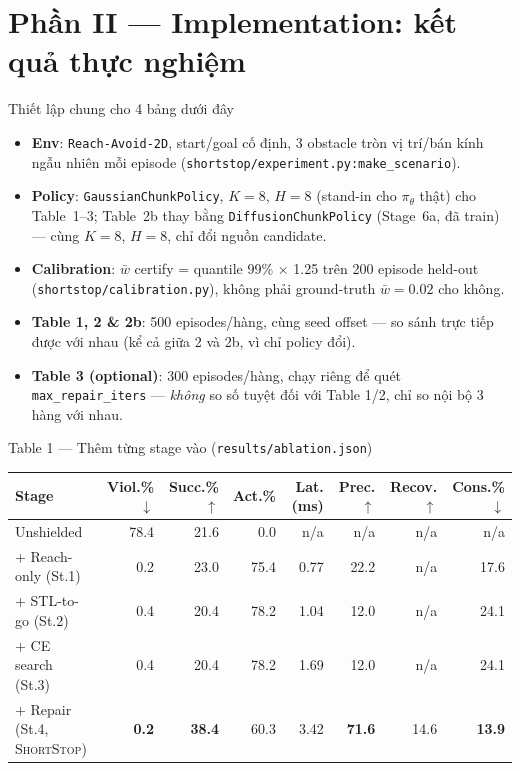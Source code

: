 \documentclass[aspectratio=169]{beamer}
\newcommand{\st}{\textsc{ShortStop}}
\begin{document}
\section{Phần II --- Implementation: kết quả thực nghiệm}

\begin{frame}[t,shrink=8]{Thiết lập chung cho 4 bảng dưới đây}
\begin{itemize}
    \item \textbf{Env}: \texttt{Reach-Avoid-2D}, start/goal cố định, 3 obstacle tròn vị trí/bán kính ngẫu nhiên mỗi episode (\texttt{shortstop/experiment.py:make\_scenario}).
    \item \textbf{Policy}: \texttt{GaussianChunkPolicy}, $K=8$, $H=8$ (stand-in cho $\pi_\theta$ thật) cho Table~1--3; Table~2b thay bằng \texttt{DiffusionChunkPolicy} (Stage~6a, đã train) --- cùng $K=8$, $H=8$, chỉ đổi nguồn candidate.
    \item \textbf{Calibration}: $\bar w$ certify = quantile 99\% $\times$ 1.25 trên 200 episode held-out (\texttt{shortstop/calibration.py}), không phải ground-truth $\bar w=0.02$ cho không.
    \item \textbf{Table 1, 2 \& 2b}: 500 episodes/hàng, cùng seed offset --- so sánh trực tiếp được với nhau (kể cả giữa 2 và 2b, vì chỉ policy đổi).
    \item \textbf{Table 3 (optional)}: 300 episodes/hàng, chạy riêng để quét \texttt{max\_repair\_iters} --- \emph{không} so số tuyệt đối với Table 1/2, chỉ so nội bộ 3 hàng với nhau.
\end{itemize}
\end{frame}

\begin{frame}[t,shrink=8]{Table 1 --- Thêm từng stage vào (\texttt{results/ablation.json})}
\scriptsize
\begin{center}
\begin{tabular}{@{}l r r r r r r r@{}}
\toprule
\textbf{Stage} & \textbf{Viol.\%$\downarrow$} & \textbf{Succ.\%$\uparrow$} & \textbf{Act.\%} & \textbf{Lat.(ms)} & \textbf{Prec.$\uparrow$} & \textbf{Recov.$\uparrow$} & \textbf{Cons.\%$\downarrow$} \\
\midrule
Unshielded & 78.4 & 21.6 & 0.0 & n/a & n/a & n/a & n/a \\
+ Reach-only (St.1) & 0.2 & 23.0 & 75.4 & 0.77 & 22.2 & n/a & 17.6 \\
+ STL-to-go (St.2) & 0.4 & 20.4 & 78.2 & 1.04 & 12.0 & n/a & 24.1 \\
+ CE search (St.3) & 0.4 & 20.4 & 78.2 & 1.69 & 12.0 & n/a & 24.1 \\
+ Repair (St.4, \st{}) & \textbf{0.2} & \textbf{38.4} & 60.3 & 3.42 & \textbf{71.6} & 14.6 & \textbf{13.9} \\
\bottomrule
\end{tabular}
\end{center}
\end{frame}
\end{document}
